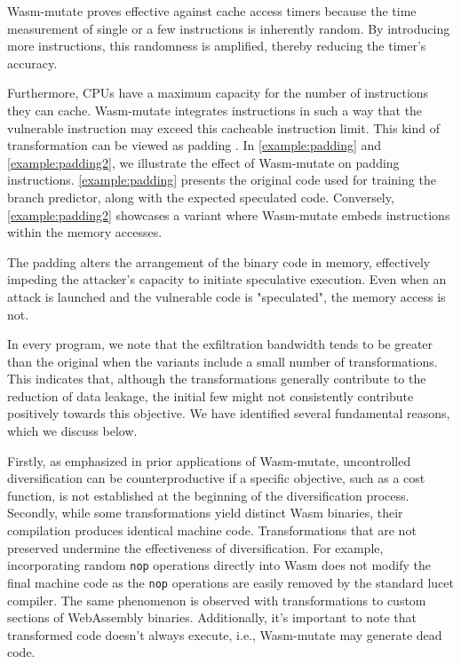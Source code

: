 \documentclass[sigplan,screen]{acmart}
\newcommand*\badge[1]{ \colorbox{red}{\color{white}#1}}
\newcommand{\tool}{Wasm-mutate\xspace}
\newcommand{\wasm}{Wasm\xspace}
\newcommand{\Wasm}{WebAssembly\xspace}
\newcommand{\todo}[1]{%
\refstepcounter{todo}
\noindent\textbf{\badge{TODO}} {\color{red}#1}
\addcontentsline{td}{todo}
{\color{red}\thesection.\thetodo\xspace #1}}
\begin{document}


\tool proves effective against cache access timers because the time measurement of single or a few instructions is inherently random. 
By introducing more instructions, this randomness is amplified, thereby reducing the timer's accuracy.

Furthermore, CPUs have a maximum capacity for the number of instructions they can cache.
\tool integrates instructions in such a way that the vulnerable instruction may exceed this cacheable instruction limit.
This kind of transformation can be viewed as padding \cite{padding}.
In \autoref{example:padding} and \autoref{example:padding2}, we illustrate the effect of \tool on padding instructions.
\autoref{example:padding} presents the original code used for training the branch predictor, along with the expected speculated code.
Conversely, \autoref{example:padding2} showcases a variant where \tool embeds instructions within the memory accesses.



The padding alters the arrangement of the binary code in memory, effectively impeding the attacker's capacity to initiate speculative execution.
Even when an attack is launched and the vulnerable code is "speculated", the memory access is not.


In every program, we note that the exfiltration bandwidth tends to be greater than the original when the variants include a small number of transformations.
This indicates that, although the transformations generally contribute to the reduction of data leakage, the initial few might not consistently contribute positively towards this objective.
We have identified several fundamental reasons, which we discuss below.

Firstly, as emphasized in prior applications of \tool \cite{CABRERAARTEAGA2023103296}, uncontrolled diversification can be counterproductive if a specific objective, such as a cost function, is not established at the beginning of the diversification process.
Secondly, while some transformations yield distinct \wasm binaries, their compilation produces identical machine code.
Transformations that are not preserved undermine the effectiveness of diversification.
For example, incorporating random \texttt{nop} operations directly into \wasm does not modify the final machine code as the \texttt{nop} operations are easily removed by the standard lucet compiler.
The same phenomenon is observed with transformations to custom sections of \Wasm binaries.
Additionally, it's important to note that transformed code doesn't always execute, i.e., \tool may generate dead code.
\end{document}
